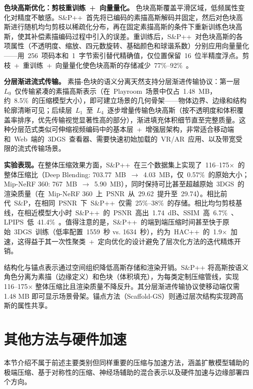 \textbf{色块高斯优化：剪枝重训练~+~向量量化。}
色块高斯覆盖平滑区域，低频属性变化对精度不敏感。S\&P++~首先将已编码的素描高斯解码并固定，然后对色块高斯进行随机均匀剪枝以稀疏化分布，再在固定素描高斯的条件下重新训练色块高斯，使其补偿素描编码过程中引入的误差。重训练后，S\&P++~对色块高斯的各项属性（不透明度、缩放、四元数旋转、基础颜色和球谐系数）分别应用向量量化——用~256~项码本和~1~字节索引替代精确值，仅位置保留~16~位半精度浮点。剪枝~+~重训练~+~向量量化使色块高斯的存储减少~77\%--92\%~。

\textbf{分层渐进流式传输。}
素描-色块的语义分离天然支持分层渐进传输协议：第一层~$L_0$~仅传输紧凑的素描高斯表示（在~Playroom~场景中仅占~1.48~MB，约~8.5\%~的压缩模型大小），即可建立场景的几何骨架——物体边界、边缘和结构轮廓清晰可见；后续层~$L_1$~至~$L_4$~逐步增量传输色块高斯（按不透明度和体积覆盖率排序，优先传输视觉显著性高的部分），渐进填充体积细节直至完整质量。这种分层范式类似可伸缩视频编码中的基本层~+~增强层架构，非常适合移动端和~Web~端的~3DGS~查看器、需要快速初始加载的~VR/AR~应用、以及带宽受限的流式传输场景。

\textbf{实验表现。}在整体压缩效果方面，S\&P++~在三个数据集上实现了~116--175$\times$~的整体压缩比（Deep Blending: 703.77~MB~$\to$~4.03~MB，仅~0.57\%~的原始大小；Mip-NeRF 360: 767~MB~$\to$~5.90~MB），同时保持可比甚至超越原始~3DGS~的渲染质量（在~Mip-NeRF 360~上~PSNR~从~29.62~提升至~29.74）。相比前代~S\&P，在相同~PSNR~下~S\&P++~仅需~25\%--38\%~的存储。相比均匀剪枝基线，在相近模型大小时~S\&P++~的~PSNR~高出~1.74~dB、SSIM~高~6.7\%~、LPIPS~低~41.4\%~。值得注意的是，S\&P++~的端到端压缩时间甚至快于原始~3DGS~训练（低率配置~1559~秒 vs. 1634~秒），约为~HAC++~的~1.9$\times$~加速，这得益于其一次性聚类~+~定向优化的设计避免了层次化方法的迭代精炼开销。

\begin{takeaway}
结构化与锚点表示通过空间组织降低高斯存储和渲染开销。S\&P++ 将高斯按语义角色分离为素描（边缘定义）和色块（体积填充），为每类定制压缩管线，实现 116--175$\times$ 整体压缩比且渲染质量不降反升。其分层渐进传输协议使移动端仅需 1.48 MB 即可显示场景骨架。锚点方法（Scaffold-GS）则通过层次结构实现跨高斯的属性共享。
\end{takeaway}


\section{其他方法与硬件加速}
\label{sec:11_6}

本节介绍不属于前述主要类别但同样重要的压缩与加速方法，涵盖扩散模型辅助的极端压缩、基于对称性的压缩、神经场辅助的混合表示以及硬件加速与边缘部署四个方向。

